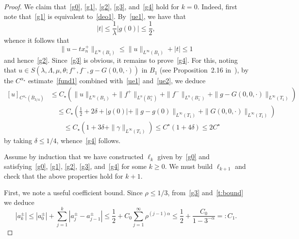 \documentclass[letter,11pt]{amsart}
\newcommand{\mao}{\alpha_{\star}}
\theoremstyle{definition}
\numberwithin{equation}{section}
\begin{document}
\begin{proof}
\medskip

We claim that~\eqref{g0}, \eqref{g1}, \eqref{g2}, \eqref{g3}, and~\eqref{g4} hold for $k = 0$.
Indeed, first note that~\eqref{g1} is equivalent to~\eqref{deo1}.
By~\eqref{ue1}, we have that
\begin{equation}
\label{t:bound}
|t| \leq \frac{1}{\lambda} |g(0)| \leq \frac{1}{2},
\end{equation}
whence it follows that
\[
\|u - t x_n^{+}\|_{L^{\infty}(B_1)} \leq \|u\|_{L^{\infty}(B_1)} + |t| \leq 1
\]
and hence~\eqref{g2}.
Since~\eqref{g3} is obvious, it remains to prove~\eqref{g4}.
For this, noting that $u \in S(\lambda, \Lambda, \mu, \theta; f^{+}, f^{-}, g - G(0,0,\cdot))$ in $B_1$ 
(see Proposition~2.16 in~\cite{E}),
by the $C^{\mao}$ estimate~\eqref{fund1} combined with~\eqref{ue1} and~\eqref{ue2}, we deduce
\[
\begin{split}
[u]_{C^{\mao}(\overline{B}_{3/4})}
&\leq C_{\star} \left( 
\|u\|_{L^{\infty}(B_1)} 
+ \|f^{+}\|_{L^n(B_1^{+})}
+ \|f^{-}\|_{L^n(B_1^{-})}
+ \|g - G(0,0,\cdot)\|_{L^{\infty}(T_1)}
\right)
\\
& \quad \leq C_{\star} \left( 
\frac{1}{2}
+ 2 \delta 
+ |g(0)| 
+ \|g - g(0)\|_{L^{\infty}(T_1)}
+ \|G(0,0,\cdot)\|_{L^{\infty}(T_1)}
\right)\\
& \qquad \leq C_{\star} \left( 
1 + 3 \delta + \|\gamma\|_{L^{\infty}(T_1)}\right) 
\leq C^{\star} \left( 1+4\delta\right) \leq 2 C^{\star}
\end{split}
\]
by taking $\delta \leq 1/4$, whence~\eqref{g4} follows.

\medskip

Assume by induction that we have constructed $\ell_k$ given by~\eqref{g0} and satisfying~\eqref{g0}, \eqref{g1}, \eqref{g2}, \eqref{g3}, and~\eqref{g4} for some $k \geq 0$.
We must build $\ell_{k+1}$ and check that the above properties hold for $k+1$.

\medskip

First, we note a useful coefficient bound.
Since $\rho \leq 1/3$, from~\eqref{g3} and~\eqref{t:bound} we deduce
\begin{equation}
\label{a:bound}
|a_k^{\pm}| \leq |a^{\pm}_0| + \sum_{j = 1}^{k} |a_j^{\pm} - a_{j-1}^{\pm}| \leq 
\frac{1}{2} + C_0 \sum_{j = 1}^{\infty}\rho^{(j-1) \alpha} 
\leq \frac{1}{2} + \frac{C_0}{1 - 3^{- \alpha}} =: C_1.
\end{equation}


\end{proof}
\end{document}
